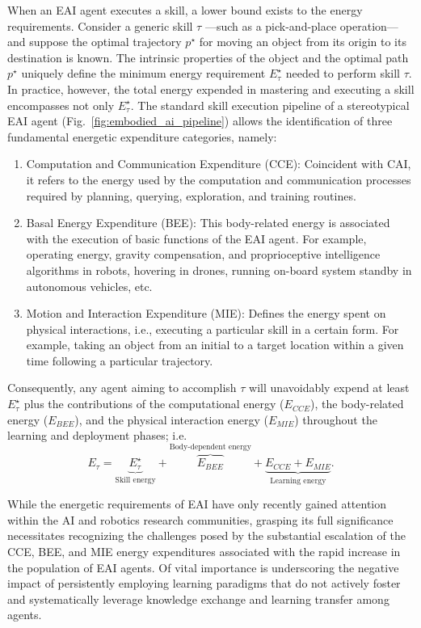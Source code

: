 \documentclass[12pt]{article}
\begin{document}
When an EAI agent executes a skill, a lower bound exists to the energy requirements. Consider a generic skill $\tau$ ---such as a pick-and-place operation--- and suppose the optimal trajectory $p^\star$ for moving an object from its origin to its destination is known. The intrinsic properties of the object and the optimal path $p^\star$ uniquely define the minimum energy requirement $E^\star_{\tau}$ needed to perform skill $\tau$. In practice, however, the total energy expended in mastering and executing a skill encompasses not only $E^\star_{\tau}$. The standard skill execution pipeline of a stereotypical EAI agent (Fig.~\ref{fig:embodied_ai_pipeline}) allows the identification of three fundamental energetic expenditure categories, namely:
\begin{enumerate}
	\item Computation and Communication Expenditure (CCE): Coincident with CAI, it refers to the energy used by the computation and communication processes required by planning, querying, exploration, and training routines.
	\item Basal Energy Expenditure (BEE): This body-related energy is associated with the execution of basic functions of the EAI agent. For example, operating energy, gravity compensation, and proprioceptive intelligence algorithms in robots, hovering in drones, running on-board system standby in autonomous vehicles, etc.
	\item Motion and Interaction Expenditure (MIE): Defines the energy spent on physical interactions, i.e., executing a particular skill in a certain form. For example, taking an object from an initial to a target location within a given time following a particular trajectory.
\end{enumerate}
Consequently, any agent aiming to accomplish $\tau$ will unavoidably expend at least $E^\star_{\tau}$ plus the contributions of the computational energy ($E_{CCE}$), the body-related energy ($E_{BEE}$), and the physical interaction energy ($E_{MIE}$) throughout the learning and deployment phases; i.e.
\begin{equation}
	E_{\tau} =  \underbrace{E^\star_{\tau}}_{\text{Skill energy}} + \overbrace{E_{BEE}}^{\text{Body-dependent energy}} + \underbrace{E_{CCE} + E_{MIE}}_{\text{Learning energy}}.
\end{equation}

While the energetic requirements of EAI have only recently gained attention within the AI and robotics research communities, grasping its full significance necessitates recognizing the challenges posed by the substantial escalation of the CCE, BEE, and MIE energy expenditures associated with the rapid increase in the population of EAI agents. Of vital importance is underscoring the negative impact of persistently employing learning paradigms that do not actively foster and systematically leverage knowledge exchange and learning transfer among agents.
\end{document}
